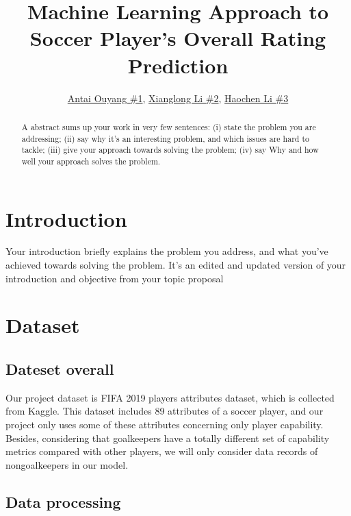 \documentclass{article}
\title{Machine Learning Approach to Soccer Player's Overall Rating Prediction}
\author{\href{mailto:ao2186@nyu.edu}{Antai Ouyang \#1}, \href{mailto:xl3215@nyu.edu}{Xianglong Li \#2}, \href{mailto:hl4151@nyu.edu}{Haochen Li \#3}}
\date{\vspace{-5ex}} %
\begin{document}
\maketitle
\thispagestyle{firstpage}


\begin{abstract}
    A abstract sums up your work in very few sentences:
    (i) state the problem you are addressing;
    (ii) say why it's an interesting problem, and which issues are hard to tackle; 
    (iii) give your approach towards solving the problem; 
    (iv) say Why and how well your approach solves the problem.
\end{abstract}


\section*{Introduction}

Your introduction briefly explains the problem you address, and what you've achieved towards solving the problem. It's an edited and updated version of your introduction and objective from your topic proposal



\section*{Dataset}

\subsection{Dateset overall}

Our project dataset is FIFA 2019 players attributes dataset, which is collected
from Kaggle. This dataset includes 89 attributes of a soccer player, and our
project only uses some of these attributes concerning only player capability.
Besides, considering that goalkeepers have a totally different set of capability
metrics compared with other players, we will only consider data records of nongoalkeepers in our model.

\subsection{Data processing}
\end{document}
